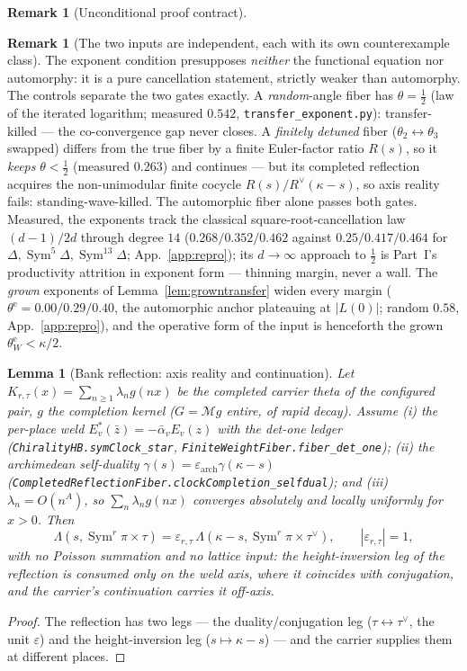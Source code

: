 \documentclass[11pt]{article}
\newtheorem{lemma}[theorem]{Lemma}
\theoremstyle{definition}
\newtheorem{remark}[theorem]{Remark}
\newcommand{\Sym}{\operatorname{Sym}}
\begin{document}
\begin{remark}[Unconditional proof contract]
\begin{enumerate}
\begin{remark}[The two inputs are independent, each with its own counterexample class]\label{rem:twogates}
The exponent condition presupposes \emph{neither} the functional equation nor automorphy: it is a pure
cancellation statement, strictly weaker than automorphy. The controls separate the two gates exactly. A
\emph{random}-angle fiber has $\theta=\tfrac12$ (law of the iterated logarithm; measured $0.542$,
\texttt{transfer\_exponent.py}): transfer-killed --- the co-convergence gap never closes. A \emph{finitely
detuned} fiber ($\theta_2\leftrightarrow\theta_3$ swapped) differs from the true fiber by a finite
Euler-factor ratio $R(s)$, so it \emph{keeps} $\theta<\tfrac12$ (measured $0.263$) and continues --- but its
completed reflection acquires the non-unimodular finite cocycle $R(s)/R^\vee(\kappa-s)$, so axis reality
fails: standing-wave-killed. The automorphic fiber alone passes both gates. Measured, the exponents track the
classical square-root-cancellation law $(d-1)/2d$ through degree $14$ ($0.268/0.352/0.462$ against
$0.25/0.417/0.464$ for $\Delta,\Sym^5\Delta,\Sym^{13}\Delta$; App.~\ref{app:repro}); its
$d\to\infty$ approach to $\tfrac12$ is Part~I's productivity attrition in exponent form --- thinning margin,
never a wall. The \emph{grown} exponents of Lemma~\ref{lem:growntransfer} widen every margin
($\theta^{\mathrm e}=0.00/0.29/0.40$, the automorphic anchor plateauing at $|L(0)|$; random $0.58$,
App.~\ref{app:repro}), and the operative form of the input is henceforth the grown
$\theta^{\mathrm e}_W<\kappa/2$.
\end{remark}

\begin{lemma}[Bank reflection: axis reality and continuation]\label{lem:bankreflection}
Let $K_{r,\tau}(x)=\sum_{n\ge1}\lambda_n g(nx)$ be the completed carrier theta of the configured pair, $g$ the
completion kernel ($G=\mathcal M g$ entire, of rapid decay). Assume \emph{(i)} the per-place weld
$E_v^{*}(\bar z)=-\bar\alpha_v E_v(z)$ with the det-one ledger (\texttt{ChiralityHB.symClock\_star},
\texttt{FiniteWeightFiber.fiber\_det\_one}); \emph{(ii)} the archimedean self-duality
$\gamma(s)=\varepsilon_{\mathrm{arch}}\gamma(\kappa-s)$
(\texttt{CompletedReflectionFiber.clockCompletion\_selfdual}); and \emph{(iii)} $\lambda_n=O(n^{A})$, so
$\sum_n\lambda_n g(nx)$ converges absolutely and locally uniformly for $x>0$. Then
\[
  \Lambda(s,\Sym^r\pi\times\tau)=\varepsilon_{r,\tau}\,\Lambda(\kappa-s,\Sym^r\pi\times\tau^\vee),
  \qquad|\varepsilon_{r,\tau}|=1,
\]
with \emph{no Poisson summation and no lattice input}: the height-inversion leg of the reflection is consumed
only on the weld axis, where it coincides with conjugation, and the carrier's continuation carries it off-axis.
\end{lemma}
\begin{proof}
The reflection has two legs --- the duality/conjugation leg ($\tau\leftrightarrow\tau^\vee$, the unit
$\varepsilon$) and the height-inversion leg ($s\mapsto\kappa-s$) --- and the carrier supplies them at
different places.


\end{proof}
\end{enumerate}
\end{remark}
\end{document}
